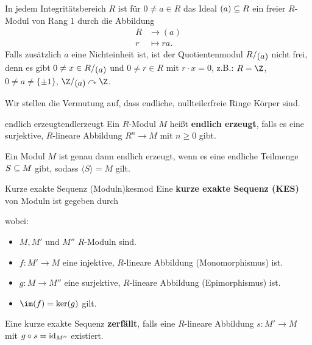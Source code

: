 \begin{beispiel}
In jedem Integritätsbereich $R$ ist für $0 \neq a \in R$ das Ideal $(a) \subseteq R$ ein freier $R$-Modul von Rang $1$ durch die Abbildung
\begin{equation}
\begin{split}
R &\to (a)\\
r &\mapsto ra.
\end{split}
\end{equation}
Falls zusätzlich $a$ eine Nichteinheit ist, ist der Quotientenmodul $\quotient{R}{(a)}$ nicht frei, denn es gibt $0 \neq x \in \quotient{R}{(a)}$ und $0 \neq r \in R$ mit $r \cdot x= 0$, z.B.: $R=\Z$, $0 \neq a \neq \{\pm 1\}$, $\quotient{\Z}{(a)} \acts \Z$.
\end{beispiel}
Wir stellen die Vermutung auf, dass endliche, nullteilerfreie Ringe Körper sind.
\begin{definition}{endlich erzeugt}{endlerzeugt}
Ein $R$-Modul $M$ heißt \textbf{endlich erzeugt}, falls es eine surjektive, $R$-lineare Abbildung $R^n \to M$ mit $n \geq 0$ gibt.
\end{definition}
\begin{bemerkung}
Ein Modul $M$ ist genau dann endlich erzeugt, wenn es eine endliche Teilmenge $S \subseteq M$ gibt, sodass $\langle S \rangle = M$ gilt.
\end{bemerkung}
\begin{definition}{Kurze exakte Sequenz (Moduln)}{kesmod}
Eine \textbf{kurze exakte Sequenz (KES)} von Moduln ist gegeben durch 
\begin{center}
\end{center}
wobei:
\begin{itemize}
\item $M,M'$ und $M''$ $R$-Moduln sind.
\item $f: M' \to M$ eine injektive, $R$-lineare Abbildung (Monomorphismus) ist.
\item $g: M \to M''$ eine surjektive, $R$-lineare Abbildung (Epimorphismus) ist.
\item $\im (f) = \ker (g)$ gilt.
\end{itemize}
Eine kurze exakte Sequenz \textbf{zerfällt}, falls eine $R$-lineare Abbildung $s: M' \to M$ mit $g \circ s = \text{id}_{M''}$ existiert.
\end{definition}
